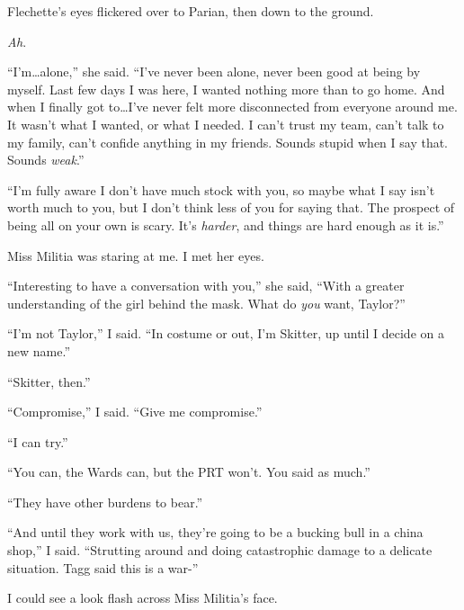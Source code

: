 Flechette's eyes flickered over to Parian, then down to the ground.



\emph{Ah}.



``I'm\ldots alone,'' she said.  ``I've never been alone, never been good at being by myself.  Last few days I was here, I wanted nothing more than to go home.  And when I finally got to\ldots I've never felt more disconnected from everyone around me.  It wasn't what I wanted, or what I needed.  I can't trust my team, can't talk to my family, can't confide anything in my friends.  Sounds stupid when I say that.  Sounds \emph{weak}.''



``I'm fully aware I don't have much stock with you, so maybe what I say isn't worth much to you, but I don't think less of you for saying that.  The prospect of being all on your own is scary.  It's \emph{harder}, and things are hard enough as it is.''



Miss Militia was staring at me.  I met her eyes.



``Interesting to have a conversation with you,'' she said, ``With a greater understanding of the girl behind the mask.  What do \emph{you} want, Taylor?''



``I'm not Taylor,'' I said.  ``In costume or out, I'm Skitter, up until I decide on a new name.''



``Skitter, then.''



``Compromise,'' I said.  ``Give me compromise.''



``I can try.''



``You can, the Wards can, but the PRT won't.  You said as much.''



``They have other burdens to bear.''



``And until they work with us, they're going to be a bucking bull in a china shop,'' I said.  ``Strutting around and doing catastrophic damage to a delicate situation.  Tagg said this is a war-''



I could see a look flash across Miss Militia's face.



